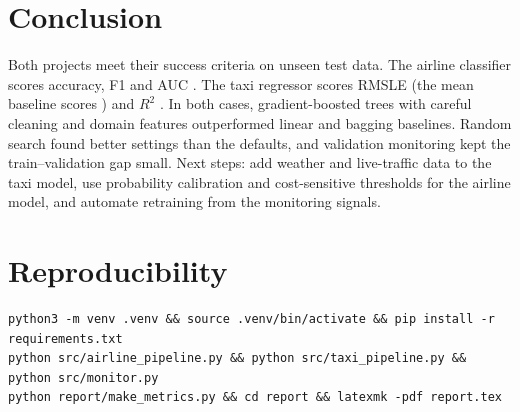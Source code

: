 \documentclass[11pt,a4paper]{article}
\begin{document}
\section{Conclusion}

Both projects meet their success criteria on unseen test data. The airline classifier scores \airTestAccPct{} accuracy, F1 \airTestF{} and AUC \airTestRocAuc. The taxi regressor scores RMSLE \taxiTestRmsle{} (the mean baseline scores \taxiMeanBaselineValRmsle) and $R^2$ \taxiTestRtwoLog.
In both cases, gradient-boosted trees with careful cleaning and domain features outperformed linear and bagging baselines. Random search found better settings than the defaults, and validation monitoring kept the train--validation gap small.
Next steps: add weather and live-traffic data to the taxi model, use probability calibration and cost-sensitive thresholds for the airline model, and automate retraining from the monitoring signals.

\section*{Reproducibility}
\begin{lstlisting}
python3 -m venv .venv && source .venv/bin/activate && pip install -r requirements.txt
python src/airline_pipeline.py && python src/taxi_pipeline.py && python src/monitor.py
python report/make_metrics.py && cd report && latexmk -pdf report.tex
\end{lstlisting}
\end{document}
